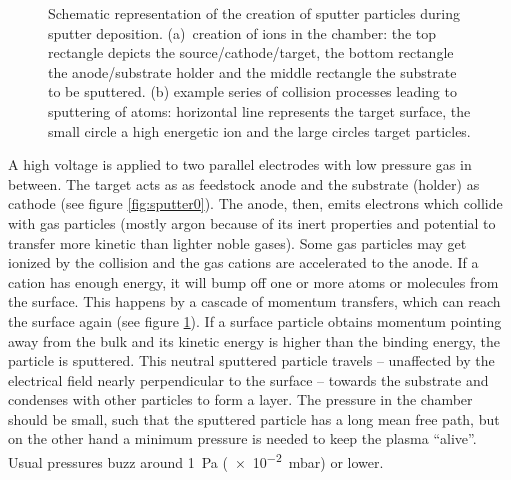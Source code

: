 \begin{figure}[tbh]
\begin{subfigure}[t]{.3\textwidth}
        \caption{}
        \label{fig:sputter1}
    \end{subfigure}
    \caption{Schematic representation of the creation of sputter particles during sputter deposition. 
    (a)~creation of ions in the chamber: 
        the top rectangle depicts the source/cathode/target, 
        the bottom rectangle the anode/substrate holder and 
        the middle rectangle the substrate to be sputtered. 
    (b) example series of collision processes leading to sputtering of atoms: 
        horizontal line represents the target surface, 
        the small circle a high energetic ion and 
        the large circles target particles. 
    }
	\label{fig:sputter}
\end{figure}

A high voltage is applied to 
two parallel electrodes with low pressure gas in between. 
The target acts as as feedstock anode and the substrate (holder) as cathode (see figure \ref{fig:sputter0}).
The anode, then, emits electrons which collide with gas particles (mostly argon because of its inert properties and potential to transfer more kinetic than lighter noble gases). 
Some gas particles may get ionized by the collision and the gas cations are accelerated to the anode. 
If a cation has enough energy, it will bump off one or more atoms or molecules from the surface. 
This happens by a cascade of momentum transfers, which can reach the surface again (see figure \ref{fig:sputter1}). 
If a surface particle obtains momentum pointing away from the bulk and its kinetic energy is higher than the binding energy, the particle is sputtered. 
This neutral sputtered particle travels -- unaffected by the electrical field nearly perpendicular to the surface -- towards the substrate and condenses with other particles to form a layer.
The pressure in the chamber should be small, such that the sputtered particle has a long mean free path, but on the other hand 
a minimum pressure is needed to keep the plasma ``alive''. 
Usual pressures buzz around \SI{1}{\Pa} (\num{e-2}\SI{}{\milli\bar}) or lower\cite{Swann1988}.

